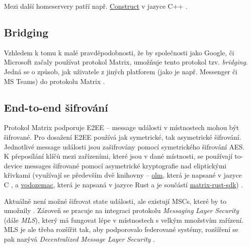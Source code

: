 Mezi další homeservery patří např.
\href{https://github.com/matrix-construct/construct}{Construct} v jazyce C++
\cite{GitHub-Construct}.

\subsection{Bridging}

Vzhledem k tomu k malé pravděpodobnosti, že by společnosti jako Google, či
Microsoft začaly používat protokol Matrix, umožňuje tento protokol tzv.
\textit{bridging}. Jedná se o způsob, jak  uživatele z jiných
platforem (jako je např. Messenger či MS Teams) do protokolu Matrix
\cite{MatrixORG-Bridges}.

\subsection{End-to-end šifrování}\label{matrix-encryption}

Protokol Matrix podporuje E2EE -- message události v místnostech mohou být
šifrované. Pro dosažení E2EE používá jak symetrické, tak asymetrické šifrování.
Jednotlivé message události jsou zašifrovány pomocí symetrického šifrování AES.
K přeposílání klíčů mezi zařízeními, které jsou v dané místnosti, se používají
to-device messages šifrované pomocí asymetrické kryptografie nad
eliptickými křivkami (využívají se především dvě knihovny --
\href{https://gitlab.matrix.org/matrix-org/olm}{olm}, která je napsané v jazyce
C \cite{GitLab-Olm}, a
\href{https://github.com/matrix-org/vodozemac}{vodozemac}, která je napsaná v
jazyce Rust a je součástí
\href{https://github.com/matrix-org/matrix-rust-sdk}{matrix-rust-sdk})
\cite{GitHub-MatrixRustSDK}.

Aktuálně není možné šifrovat state události, ale existují MSCs, které by to
umožnily \cite{GitHub-MSC3414}. Zároveň se pracuje na integraci protokolu
\textit{Messaging Layer Security} (dále \textit{MLS}), který má fungovat lépe v
místnostech s velkým množstvím zařízení. MLS je ale třeba rozšířit tak, aby
podporovalo federované systémy, rozšíření se pak nazývá \textit{Decentralized
	Message Layer Security} \cite{AreWeMLSYet}.
